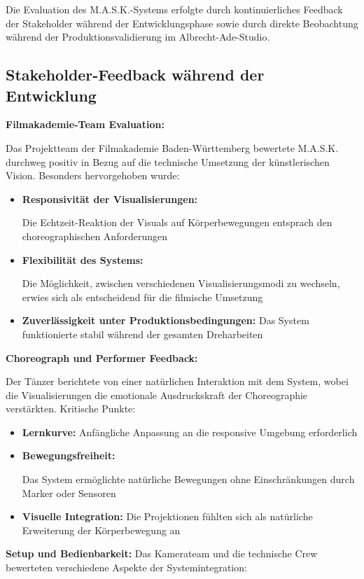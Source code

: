 Die Evaluation des M.A.S.K.-Systems erfolgte durch kontinuierliches Feedback der Stakeholder während der Entwicklungsphase sowie durch direkte Beobachtung während der Produktionsvalidierung im Albrecht-Ade-Studio.

\subsection{Stakeholder-Feedback während der Entwicklung}

\textbf{Filmakademie-Team Evaluation:}
\raggedright Das Projektteam der Filmakademie Baden-Württemberg bewertete M.A.S.K. durchweg positiv in Bezug auf die technische Umsetzung der künstlerischen Vision. Besonders hervorgehoben wurde:

\begin{itemize}
    \item \textbf{Responsivität der Visualisierungen:} \raggedright Die Echtzeit-Reaktion der Visuals auf Körperbewegungen entsprach den choreographischen Anforderungen
    \item \textbf{Flexibilität des Systems:} \raggedright Die Möglichkeit, zwischen verschiedenen Visualisierungsmodi zu wechseln, erwies sich als entscheidend für die filmische Umsetzung
    \item \textbf{Zuverlässigkeit unter Produktionsbedingungen:} Das System funktionierte stabil während der gesamten Dreharbeiten
\end{itemize}

\textbf{Choreograph und Performer Feedback:}
\raggedright Der Tänzer berichtete von einer natürlichen Interaktion mit dem System, wobei die Visualisierungen die emotionale Ausdruckskraft der Choreographie verstärkten. Kritische Punkte:

\begin{itemize}
    \item \textbf{Lernkurve:} Anfängliche Anpassung an die responsive Umgebung erforderlich
    \item \textbf{Bewegungsfreiheit:} \raggedright Das System ermöglichte natürliche Bewegungen ohne Einschränkungen durch Marker oder Sensoren
    \item \textbf{Visuelle Integration:} Die Projektionen fühlten sich als natürliche Erweiterung der Körperbewegung an
\end{itemize}

\textbf{Setup und Bedienbarkeit:}
Das Kamerateam und die technische Crew bewerteten verschiedene Aspekte der Systemintegration:

